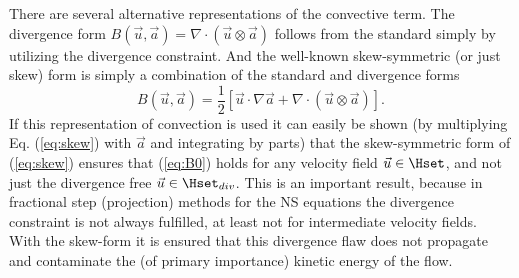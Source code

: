 There are several alternative representations of the convective term. The divergence form $B(\vec{u},\vec{a})=\nabla \cdot (\vec{u} \otimes \vec{a})$ follows from the standard simply by utilizing the divergence constraint. And the well-known skew-symmetric (or just skew) form is simply a combination of the standard and divergence forms
\begin{equation}
 B(\vec{u},\vec{a}) = \frac{1}{2}\left[ \vec{u}\cdot \nabla \vec{a} + \nabla \cdot (\vec{u} \otimes \vec{a}) \right].
\label{eq:skew}
\end{equation}
If this representation of convection is used it can easily be shown (by multiplying Eq. (\ref{eq:skew}) with $\vec{a}$ and integrating by parts) that the skew-symmetric form of (\ref{eq:skew}) ensures that (\ref{eq:B0}) holds for any velocity field $\vec{u} \in \Hset$, and not just the divergence free $\vec{u} \in \Hset_{div}$. This is an important result, because in fractional step (projection) methods for the NS equations the divergence constraint is not always fulfilled, at least not for intermediate velocity fields. With the skew-form it is ensured that this divergence flaw does not propagate and contaminate the (of primary importance) kinetic energy of the flow.


